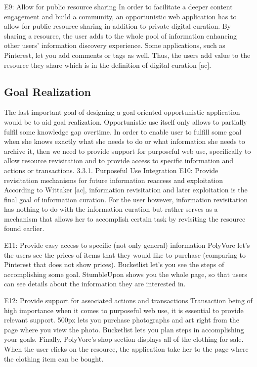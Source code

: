 \documentclass{casconpaper}
\begin{document}
{E9: Allow for public resource sharing 
In order to facilitate a deeper content engagement and build a community, an opportunistic web application has to allow for public resource sharing in addition to private digital curation. By sharing a resource, the user adds to the whole pool of information enhancing other users’ information discovery experience. Some applications, such as Pinterest, let you add comments or tags as well. Thus, the users add value to the resource they share which is in the definition of digital curation [ac].

} %

{\subsection{Goal Realization }
The last important goal of designing a goal-oriented opportunistic application would be to aid goal realization. Opportunistic use itself only allows to partially fulfil some knowledge gap overtime. In order to enable user to fulfill some goal when she knows exactly what she needs to do or what information she needs to archive it, then we need to provide support for purposeful web use, specifically to allow resource revisitation and to provide access to specific information and actions or transactions.
3.3.1. Purposeful Use Integration
E10: Provide revisitation mechanisms for future information reaccess and exploitation
According to Wittaker [ac], information revisitation and later exploitation is the final goal of information curation. For the user however, information revisitation has nothing to do with the information curation but rather serves as a mechanism that allows her to accomplish certain task by revisiting the resource found earlier.

E11: Provide easy access to specific (not only general) information
PolyVore let’s the users see the prices of items that they would like to purchase (comparing to Pinterest that does not show prices). Bucketlist let’s you see the steps of accomplishing some goal. StumbleUpon shows you the whole page, so that users can see details about the information they are interested in. 

E12: Provide support for associated actions and transactions
Transaction being of high importance when it comes to purposeful web use, it is essential to provide relevant support. 500px lets you purchase photographs and art right from the page where you view the photo. Bucketlist lets you plan steps in accomplishing your goals. Finally, PolyVore’s shop section displays all of the clothing for sale. When the user clicks on the resource, the application take her to the page where the clothing item can be bought.


} %
\end{document}
